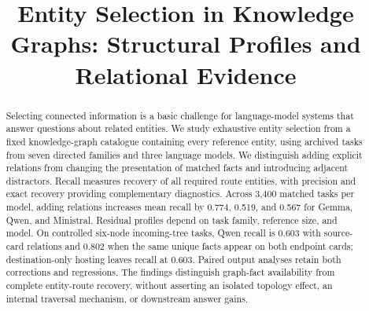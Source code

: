 \documentclass[sigconf,anonymous,review,balance=false]{acmart}
\title[Entity Selection in Knowledge Graphs]{Entity Selection in Knowledge Graphs: Structural Profiles and Relational Evidence}
\begin{document}
\begin{abstract}
Selecting connected information is a basic challenge for language-model systems that answer questions about related entities. We study exhaustive entity selection from a fixed knowledge-graph catalogue containing every reference entity, using archived tasks from seven directed families and three language models. We distinguish adding explicit relations from changing the presentation of matched facts and introducing adjacent distractors. Recall measures recovery of all required route entities, with precision and exact recovery providing complementary diagnostics. Across 3,400 matched tasks per model, adding relations increases mean recall by 0.774, 0.519, and 0.567 for Gemma, Qwen, and Ministral. Residual profiles depend on task family, reference size, and model. On controlled six-node incoming-tree tasks, Qwen recall is 0.603 with source-card relations and 0.802 when the same unique facts appear on both endpoint cards; destination-only hosting leaves recall at 0.603. Paired output analyses retain both corrections and regressions. The findings distinguish graph-fact availability from complete entity-route recovery, without asserting an isolated topology effect, an internal traversal mechanism, or downstream answer gains.
\end{abstract}
\maketitle







\clearpage


\clearpage

\end{document}

